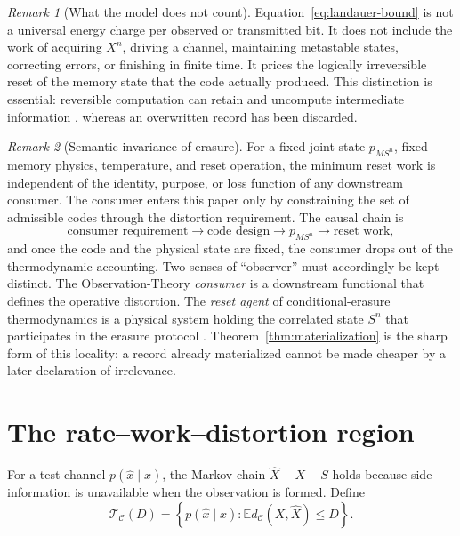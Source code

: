 \documentclass[letterpaper,onecolumn]{IEEEtran}
\theoremstyle{definition}
\theoremstyle{remark}
\newtheorem{remark}{Remark}
\newcommand{\E}{\mathbb{E}}
\newcommand{\cC}{\mathcal{C}}
\newcommand{\hX}{\widehat{X}}
\newcommand{\1}{\mathbf{1}}
\begin{document}
\begin{remark}[What the model does not count]
Equation~\eqref{eq:landauer-bound} is not a universal energy charge per observed
or transmitted bit. It does not include the work of acquiring $X^n$, driving a
channel, maintaining metastable states, correcting errors, or finishing in
finite time. It prices the logically irreversible reset of the memory state
that the code actually produced. This distinction is essential: reversible
computation can retain and uncompute intermediate information
\cite{bennett1973}, whereas an overwritten record has been discarded.
\end{remark}

\begin{remark}[Semantic invariance of erasure]\label{rem:invariance}
For a fixed joint state $p_{MS^n}$, fixed memory physics, temperature, and
reset operation, the minimum reset work is independent of the identity,
purpose, or loss function of any downstream consumer. The consumer enters
this paper only by constraining the set of admissible codes through the
distortion requirement. The causal chain is
\begin{equation*}
 \text{consumer requirement}\longrightarrow\text{code design}
 \longrightarrow p_{MS^n}\longrightarrow\text{reset work},
\end{equation*}
and once the code and the physical state are fixed, the consumer drops out
of the thermodynamic accounting. Two senses of ``observer'' must accordingly
be kept distinct. The Observation-Theory \emph{consumer} is a downstream
functional that defines the operative distortion. The \emph{reset agent} of
conditional-erasure thermodynamics is a physical system holding the
correlated state $S^n$ that participates in the erasure protocol
\cite{delrio2011}. Theorem~\ref{thm:materialization} is the sharp form of
this locality: a record already materialized cannot be made cheaper by a
later declaration of irrelevance.
\end{remark}

\section{The rate--work--distortion region}\label{sec:region}

For a test channel $p(\hat x\mid x)$, the Markov chain
$\hX-X-S$ holds because side information is unavailable when the observation is
formed. Define
\begin{equation}
 \mathcal T_{\cC}(D)
 =\left\{p(\hat x\mid x):\E d_{\cC}(X,\hX)\le D\right\}.
\end{equation}
\end{document}
